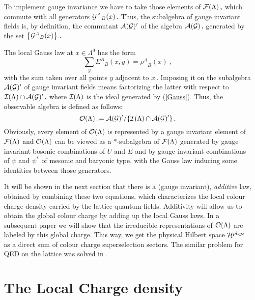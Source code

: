 \documentclass[a4paper,12pt]{article}
\begin{document}
To implement gauge invariance we have to take those elements of
${\cal F}(\Lambda )\, ,$ which commute with all generators $
{{\cal G}^A}_B(x) \,.$ Thus, the subalgebra of gauge invariant
fields is, by definition, the commutant ${\cal A}({\cal G})' $ of
the algebra ${\cal A}({\cal G}) \, ,$ generated by the set $
\left\{ {{\cal G}^A}_B(x) \right\} \,.$

The local Gauss law at $x\in {\Lambda}^0$ has the form
\begin{equation}
\label{Gauss} \sum_y {E^A}_B(x,y) = {\rho^A}_B(x) \ ,
\end{equation}
with the sum taken over all points $y$ adjacent to $x \, .$
Imposing it on the subalgebra ${\cal A}({\cal G})' $ of gauge
invariant fields means factorizing the latter with respect to
${\cal I}(\Lambda ) \cap {\cal A}({\cal G})' \, ,$ where ${\cal
I}(\Lambda )$ is the ideal  generated by (\ref{Gauss}). Thus, the
observable algebra is defined as follows:
\begin{equation}
\label{observ} {\cal O}(\Lambda ) := {\cal A}({\cal G})' / \{{\cal
I}(\Lambda ) \cap {\cal A}({\cal G})'\} \, .
\end{equation}
Obviously, every element of ${\cal O}(\Lambda )$ is represented by
a gauge invariant element of ${\cal F}(\Lambda )$ and ${\cal
O}(\Lambda )$ can be viewed as a $*$-subalgebra of ${\cal
F}(\Lambda )$ generated by gauge invariant bosonic combinations of
$U$ and $E$ and by gauge invariant combinations of $\psi$ and
$\psi^*$ of mesonic and baryonic type, with the Gauss law inducing
some identities between those generators.


It will be shown in the next section that there is a (gauge
invariant), {\em additive} law, obtained by combining these two
equations, which characterizes the local colour charge density
carried by the lattice quantum fields. Additivity will allow us to
obtain the global colour charge by adding up the local Gauss laws.
In a subsequent paper we will show that the irreducible
representations of ${\cal O}(\Lambda )$ are labeled by this global
charge. This way, we get the physical Hilbert space ${\cal
H}^{phys}$ as a direct sum of colour charge superselection
sectors. The similar problem for QED on the lattice was solved in
\cite{KRT}.



\setcounter{equation}{0}
\section{The Local Charge density}
\label{Gauss Law}
\end{document}
